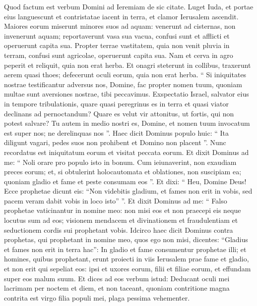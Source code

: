 \begin{biblechapter}
\begin{biblechapter}
\begin{biblechapter}
\begin{biblechapter}
\begin{biblechapter}
\begin{biblechapter}
\begin{biblechapter}
\begin{biblechapter}
\begin{biblechapter}
\begin{biblechapter}
\begin{biblechapter}
\begin{biblechapter}
\begin{biblechapter}
\begin{biblechapter}
\verse Quod factum est verbum Domini ad Ieremiam de sic citate.
 \verse Luget Iuda,
 et portae eius languescunt
 et contristatae iacent in terra,
 et clamor Ierusalem ascendit.
 \verse Maiores eorum miserunt minores suos ad aquam:
 venerunt ad cisternas,
 non invenerunt aquam;
 reportaverunt vasa sua vacua,
 confusi sunt et afflicti
 et operuerunt capita sua.
 \verse Propter terrae vastitatem,
 quia non venit pluvia in terram,
 confusi sunt agricolae,
 operuerunt capita sua.
 \verse Nam et cerva in agro peperit et reliquit,
 quia non erat herba.
 \verse Et onagri steterunt in collibus,
 traxerunt aerem quasi thoes;
 defecerunt oculi eorum,
 quia non erat herba.
 \verse “ Si iniquitates nostrae testificantur adversus nos,
 Domine, fac propter nomen tuum,
 quoniam multae sunt aversiones nostrae,
 tibi peccavimus.
 \verse Exspectatio Israel,
 salvator eius in tempore tribulationis,
 quare quasi peregrinus es in terra
 et quasi viator declinans ad pernoctandum?
 \verse Quare es velut vir attonitus,
 ut fortis, qui non potest salvare?
 Tu autem in medio nostri es, Domine,
 et nomen tuum invocatum est super nos;
 ne derelinquas nos ”.
 \verse Haec dicit Dominus populo huic: “ Ita diligunt vagari, pedes suos non prohibent et Domino non placent ”. Nunc recordatus est iniquitatum eorum et visitat peccata eorum.
 \verse Et dixit Dominus ad me: “ Noli orare pro populo isto in bonum. 
\verse Cum ieiunaverint, non exaudiam preces eorum; et, si obtulerint holocautomata et oblationes, non suscipiam ea; quoniam gladio et fame et peste consumam eos ”. 
\verse Et dixi: “ Heu, Domine Deus! Ecce prophetae dicunt eis: “Non videbitis gladium, et fames non erit in vobis, sed pacem veram dabit vobis in loco isto” ”. 
\verse Et dixit Dominus ad me: “ Falso prophetae vaticinantur in nomine meo: non misi eos et non praecepi eis neque locutus sum ad eos; visionem mendacem et divinationem et fraudulentiam et seductionem cordis sui prophetant vobis. 
\verse Idcirco haec dicit Dominus contra prophetas, qui prophetant in nomine meo, quos ego non misi, dicentes: “Gladius et fames non erit in terra hac”: In gladio et fame consumentur prophetae illi; 
\verse et homines, quibus prophetant, erunt proiecti in viis Ierusalem prae fame et gladio, et non erit qui sepeliat eos: ipsi et uxores eorum, filii et filiae eorum, et effundam super eos malum suum.
 \verse Et dices ad eos verbum istud:
 Deducant oculi mei lacrimam
 per noctem et diem, et non taceant,
 quoniam contritione magna contrita est
 virgo filia populi mei,
 plaga pessima vehementer.

\end{biblechapter}
\end{biblechapter}
\end{biblechapter}
\end{biblechapter}
\end{biblechapter}
\end{biblechapter}
\end{biblechapter}
\end{biblechapter}
\end{biblechapter}
\end{biblechapter}
\end{biblechapter}
\end{biblechapter}
\end{biblechapter}
\end{biblechapter}
